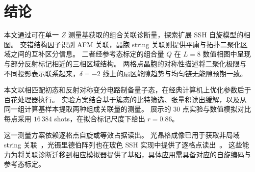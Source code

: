 \section{结论}
\label{sec:conclusion}

本文通过可在单一 $Z$ 测量基获取的组合关联诊断量，探索扩展 SSH 自旋模型的相图。
交错结构因子识别 AFM 关联，晶胞 string 关联则提供平庸与拓扑二聚化区域之间的互补区分信息。
二者经参考态标定的组合量 $Q$ 在 $L=8$ 数值相图中呈现与部分反射标记相近的三相区域结构。
两格点晶胞的对称性描述将二聚化极限与不同投影表示联系起来，$\delta=-2$ 线上的扇区能隙趋势与均匀链无能隙预期一致。

本文以相匹配初态和反射对称变分电路制备量子态，在经典计算机上优化参数后于百花处理器执行。
实验方案结合基于簇态的比特筛选、张量积读出缓解，以及从同一组计算基样本提取两种组成关联量的测量。
展示的 $30$ 点实验与数值模拟对比每点采用 $16\,384$ shots，在拟合标记尺度下给出 $r=0.86$。

这一测量方案依赖逐格点自旋或等效占据读出。
光晶格成像已用于获取非局域 string 关联~\cite{endres2011observation}，光镊里德伯阵列也在玻色 SSH 实现中提供了逐格点读出~\cite{deleseleuc2019observation}。
这些能力为将关联诊断迁移到相应模拟器提供了基础，具体应用需具备对应的自旋编码与参考态标定。

